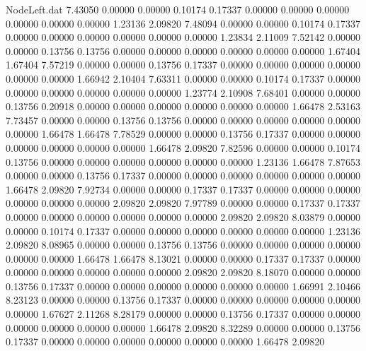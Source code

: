\begin{filecontents}{NodeLeft.dat}
   7.43050    0.00000    0.00000     0.10174    0.17337    0.00000    0.00000    0.00000    0.00000    0.00000    0.00000    1.23136    2.09820
   7.48094    0.00000    0.00000     0.10174    0.17337    0.00000    0.00000    0.00000    0.00000    0.00000    0.00000    1.23834    2.11009
   7.52142    0.00000    0.00000     0.13756    0.13756    0.00000    0.00000    0.00000    0.00000    0.00000    0.00000    1.67404    1.67404
   7.57219    0.00000    0.00000     0.13756    0.17337    0.00000    0.00000    0.00000    0.00000    0.00000    0.00000    1.66942    2.10404
   7.63311    0.00000    0.00000     0.10174    0.17337    0.00000    0.00000    0.00000    0.00000    0.00000    0.00000    1.23774    2.10908
   7.68401    0.00000    0.00000     0.13756    0.20918    0.00000    0.00000    0.00000    0.00000    0.00000    0.00000    1.66478    2.53163
   7.73457    0.00000    0.00000     0.13756    0.13756    0.00000    0.00000    0.00000    0.00000    0.00000    0.00000    1.66478    1.66478
   7.78529    0.00000    0.00000     0.13756    0.17337    0.00000    0.00000    0.00000    0.00000    0.00000    0.00000    1.66478    2.09820
   7.82596    0.00000    0.00000     0.10174    0.13756    0.00000    0.00000    0.00000    0.00000    0.00000    0.00000    1.23136    1.66478
   7.87653    0.00000    0.00000     0.13756    0.17337    0.00000    0.00000    0.00000    0.00000    0.00000    0.00000    1.66478    2.09820
   7.92734    0.00000    0.00000     0.17337    0.17337    0.00000    0.00000    0.00000    0.00000    0.00000    0.00000    2.09820    2.09820
   7.97789    0.00000    0.00000     0.17337    0.17337    0.00000    0.00000    0.00000    0.00000    0.00000    0.00000    2.09820    2.09820
   8.03879    0.00000    0.00000     0.10174    0.17337    0.00000    0.00000    0.00000    0.00000    0.00000    0.00000    1.23136    2.09820
   8.08965    0.00000    0.00000     0.13756    0.13756    0.00000    0.00000    0.00000    0.00000    0.00000    0.00000    1.66478    1.66478
   8.13021    0.00000    0.00000     0.17337    0.17337    0.00000    0.00000    0.00000    0.00000    0.00000    0.00000    2.09820    2.09820
   8.18070    0.00000    0.00000     0.13756    0.17337    0.00000    0.00000    0.00000    0.00000    0.00000    0.00000    1.66991    2.10466
   8.23123    0.00000    0.00000     0.13756    0.17337    0.00000    0.00000    0.00000    0.00000    0.00000    0.00000    1.67627    2.11268
   8.28179    0.00000    0.00000     0.13756    0.17337    0.00000    0.00000    0.00000    0.00000    0.00000    0.00000    1.66478    2.09820
   8.32289    0.00000    0.00000     0.13756    0.17337    0.00000    0.00000    0.00000    0.00000    0.00000    0.00000    1.66478    2.09820

\end{filecontents}
